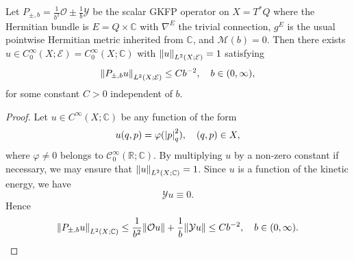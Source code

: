 \documentclass[AHL,Unicode,longabstracts]{cedram}
\newcommand{\C}{\mathbb{C}}
\newcommand{\R}{\mathbb{R}}
\newcommand{\clC}{\mathcal{C}}
\newcommand{\clY}{\mathcal{Y}}
\newcommand{\clO}{\mathcal{O}}
\newcommand{\clE}{\mathcal{E}}
\newcommand{\clM}{\mathcal{M}}
\newcommand{\abs}[1]{\left| #1 \right|}
\newcommand\norm[1]{\left\lVert#1\right\rVert}
\let\originalleft\left
\let\originalright\right
\renewcommand{\left}{\mathopen{}\mathclose\bgroup\originalleft}
\renewcommand{\right}{\aftergroup\egroup\originalright}
\begin{document}
\begin{prop}\label{quasimode_proposition}
Let $P_{\pm,b} = \frac{1}{b^2} \clO\pm \frac{1}{b}\clY$ be the scalar GKFP operator on $X = T^*Q$ where the Hermitian bundle is $E = Q \times \C$ with $\nabla^E$ the trivial connection, $g^E$ is the usual pointwise Hermitian metric inherited from $\C$, and $\clM(b)=0$. Then there exists $u \in C^\infty_{0}(X; \clE) = C^\infty_{0}(X; \C)$ with $\norm{u}_{L^2(X; \clE)} = 1$ satisfying
\begin{equation}\label{scalar_quasimode_bound}
\norm{P_{\pm,b}u}_{L^2(X;\clE)} \le Cb^{-2}, \quad b \in (0,\infty),
\end{equation}
for some constant $C>0$ independent of $b$.
\end{prop}
\begin{proof}
Let $u \in C^\infty(X; \C)$ be any function of the form
\begin{equation}
u(q,p) = \varphi(\abs{p}^2_q), \quad (q,p) \in X,
\end{equation}
where $\varphi\neq 0$ belongs to $\clC^{\infty}_{0}(\R;\C)$. By multiplying $u$ by a non-zero constant if necessary, we may ensure that $\norm{u}_{L^2(X; \C)} = 1$. Since $u$ is a function of the kinetic energy, we have
\begin{equation}
\clY u \equiv 0.
\end{equation}
Hence
\begin{equation}\label{harmonic_osc_applied_to_quasimode}
\norm{P_{\pm,b} u}_{L^2(X;\C)} \le \frac{1}{b^2} \norm{\clO u} + \frac{1}{b} \norm{\clY u} \le Cb^{-2}, \quad b \in (0,\infty).\qedhere
\end{equation}
\end{proof}
\end{document}

